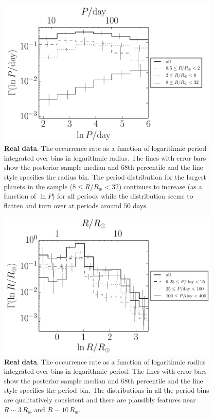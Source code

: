 \documentclass[12pt,preprint]{aastex}
\newcommand{\figlabel}[1]{\label{fig:#1}}
\newcommand{\period}{\ensuremath{P}}
\begin{document}
\begin{figure}[p]
\begin{center}
\includegraphics{figures/results/period.pdf}
\end{center}
\caption{%
{\bf Real data}.
The occurrence rate as a function of logarithmic period integrated over bins
in logarithmic radius.
The lines with error bars show the posterior sample median and 68th
percentile and the line style specifies the radius bin.
The period distribution for the largest planets in the sample
($8 \le R/R_\oplus < 32$) continues to increase (as a function of
$\ln\period$) for all periods while the distribution seems to flatten and
turn over at periods around 50 days.
\figlabel{period}}
\end{figure}

\begin{figure}[p]
\begin{center}
\includegraphics{figures/results/radius.pdf}
\end{center}
\caption{%
{\bf Real data}.
The occurrence rate as a function of logarithmic radius integrated over bins
in logarithmic period.
The lines with error bars show the posterior sample median and 68th
percentile and the line style specifies the period bin.
The distributions in all the period bins are qualitatively consistent and
there are plausibly features near $R\sim3\,R_\oplus$ and $R\sim10\,R_\oplus$.
\figlabel{radius}}
\end{figure}
\end{document}
